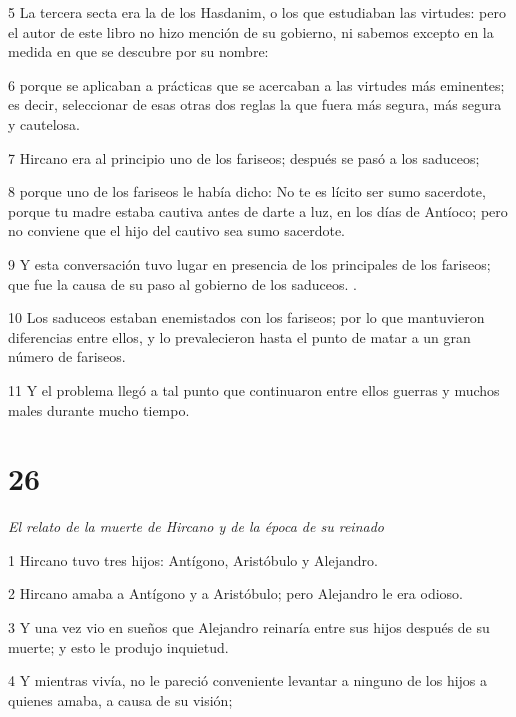 \par 5 La tercera secta era la de los Hasdanim, o los que estudiaban las virtudes: pero el autor de este libro no hizo mención de su gobierno, ni sabemos excepto en la medida en que se descubre por su nombre:

\par 6 porque se aplicaban a prácticas que se acercaban a las virtudes más eminentes; es decir, seleccionar de esas otras dos reglas la que fuera más segura, más segura y cautelosa.

\par 7 Hircano era al principio uno de los fariseos; después se pasó a los saduceos;

\par 8 porque uno de los fariseos le había dicho: No te es lícito ser sumo sacerdote, porque tu madre estaba cautiva antes de darte a luz, en los días de Antíoco; pero no conviene que el hijo del cautivo sea sumo sacerdote.

\par 9 Y esta conversación tuvo lugar en presencia de los principales de los fariseos; que fue la causa de su paso al gobierno de los saduceos. .

\par 10 Los saduceos estaban enemistados con los fariseos; por lo que mantuvieron diferencias entre ellos, y lo prevalecieron hasta el punto de matar a un gran número de fariseos.

\par 11 Y el problema llegó a tal punto que continuaron entre ellos guerras y muchos males durante mucho tiempo.

\chapter{26}

\par \textit{El relato de la muerte de Hircano y de la época de su reinado}

\par 1 Hircano tuvo tres hijos: Antígono, Aristóbulo y Alejandro.

\par 2 Hircano amaba a Antígono y a Aristóbulo; pero Alejandro le era odioso.

\par 3 Y una vez vio en sueños que Alejandro reinaría entre sus hijos después de su muerte; y esto le produjo inquietud.

\par 4 Y mientras vivía, no le pareció conveniente levantar a ninguno de los hijos a quienes amaba, a causa de su visión;

